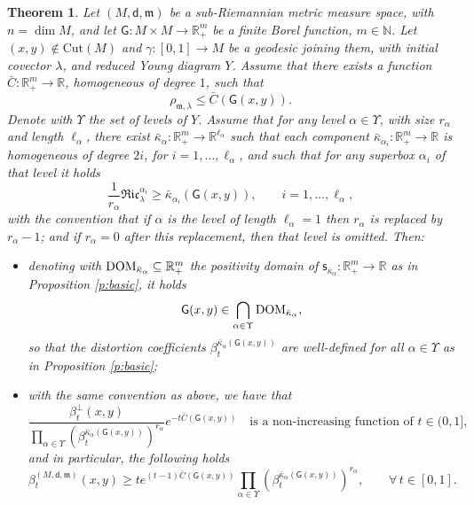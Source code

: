 \documentclass[11pt,a4paper]{article}
\theoremstyle{plain}
\newtheorem{theorem}{Theorem}[section]
\theoremstyle{definition}
\theoremstyle{remark}
\numberwithin{equation}{section}
\newcommand{\R}{\mathbb{R}} %
\newcommand{\N}{\mathbb{N}} %
\newcommand{\DOM}{{\rm{DOM}}}
\newcommand{\sfs}{\mathsf{s}}
\newcommand{\mm}{\mathfrak m}
\newcommand{\sfd}{\mathsf d}
\newcommand{\sfG}{\mathsf G}
\begin{document}
\begin{theorem}\label{thm:maincomparison}
Let $(M,\sfd,\mm)$ be a sub-Riemannian metric measure space, with $n=\dim M$, and let $\sfG : M \times M \to \R^m_+$ be a finite Borel function, $m\in \N$. Let $(x,y)\notin \mathrm{Cut}(M)$ and $\gamma :[0,1]\to M$ be a geodesic joining them, with initial covector $\lambda$, and reduced Young diagram $Y$. Assume that there exists a function $\bar{C}: \R^m_+\to \R$, homogeneous of degree $1$, such that
\begin{equation}
\rho_{\mm,\lambda} \leq \bar{C}(\sfG(x,y)).
\end{equation}
Denote with $\Upsilon$ the set of levels of $Y$. Assume that for any level $\alpha\in \Upsilon$, with size $r_\alpha$ and length $\ell_\alpha$, there exist $\bar{\kappa}_\alpha : \R^m_+ \to \R^{\ell_\alpha}$ such that each component $\bar{\kappa}_{\alpha_i} : \R^m_+\to \R$ is homogeneous of degree $2i$, for $i=1,\dots,\ell_{\alpha}$, and such that for any superbox $\alpha_i$ of that level it holds
\begin{equation}
\frac{1}{r_\alpha}\mathfrak{Ric}^{\alpha_i}_{\lambda} \geq \bar{\kappa}_{\alpha_i}(\sfG(x,y)), \qquad i=1,\dots,\ell_\alpha,
\end{equation}
with the convention that if $\alpha$ is the level of length $\ell_{\alpha}=1$ then $r_\alpha$ is replaced by $r_\alpha-1$; and if $r_\alpha =0$ after this replacement, then that level is omitted. Then:
\begin{itemize}
\item denoting with $\DOM_{\bar\kappa_\alpha} \subseteq \R^m_+$ the positivity domain of $\sfs_{\bar{\kappa}_{\alpha}}:\R^m_+\to \R$ as in Proposition \ref{p:basic}, it holds
\begin{equation}
\sfG(x,y)\in \bigcap_{\alpha\in\Upsilon} \DOM_{\bar{\kappa}_\alpha},
\end{equation}
so that the distortion coefficients $\beta_t^{\bar{\kappa}_\alpha(\sfG(x,y))}$ are well-defined for all $\alpha \in \Upsilon$ as in Proposition \ref{p:basic};
\item with the same convention as above, we have that
\begin{equation}
\frac{\beta_t^\perp(x,y)}{\displaystyle\prod_{\alpha \in \Upsilon} \left(\beta_t^{\bar{\kappa}_{\alpha}(\sfG(x,y))}\right)^{r_\alpha}}e^{-t\bar{C}(\sfG(x,y)) } \quad \text{is a non-increasing function of $t\in (0,1]$},
\end{equation}
and in particular, the following holds
\begin{equation}
\beta_t^{(M,\sfd,\mm)}(x,y) \geq t e^{(t-1)\bar{C}(\sfG(x,y))}  \prod_{\alpha \in \Upsilon} \left(\beta_t^{\bar{\kappa}_{\alpha}(\sfG(x,y))}\right)^{r_\alpha}, \qquad \forall\, t\in [0,1].
\end{equation}
\end{itemize}
\end{theorem}
\end{document}
